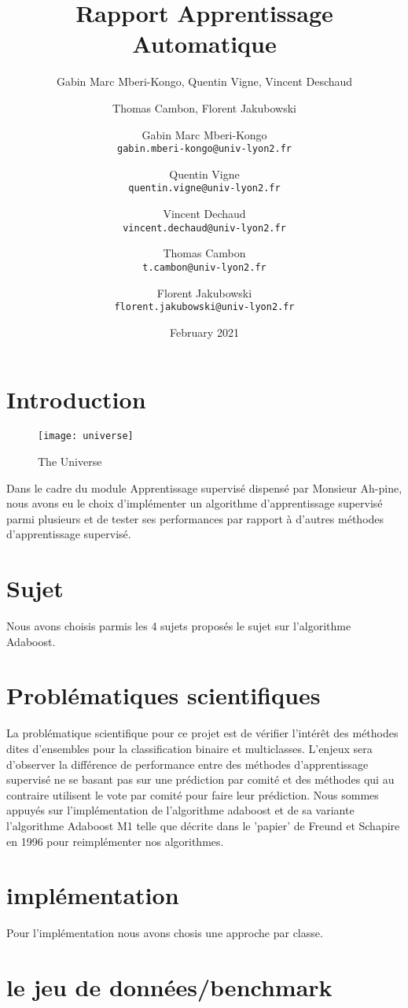 \documentclass{article}
\title{Rapport Apprentissage Automatique}
\author{Gabin Marc Mberi-Kongo, Quentin Vigne, Vincent Deschaud}
\author{Thomas Cambon, Florent Jakubowski }
\author{
  Gabin Marc Mberi-Kongo\\
  \texttt{gabin.mberi-kongo@univ-lyon2.fr}
  \and
  Quentin Vigne\\
  \texttt{quentin.vigne@univ-lyon2.fr}
  \and
  Vincent Dechaud\\
  \texttt{vincent.dechaud@univ-lyon2.fr}
  \and
  Thomas Cambon\\
  \texttt{t.cambon@univ-lyon2.fr}
  \and
  Florent Jakubowski\\
  \texttt{florent.jakubowski@univ-lyon2.fr}
}
\date{February 2021}
\begin{document}
\maketitle

\tableofcontents

\section{Introduction}

\begin{figure}[h!]
\centering
\texttt{[image: universe]}
\caption{The Universe}
\label{fig:universe}
\end{figure}

Dans le cadre du module Apprentissage supervisé dispensé par Monsieur Ah-pine, nous avons eu le choix d'implémenter un algorithme d'apprentissage supervisé parmi plusieurs et de tester ses performances par rapport à d'autres méthodes d'apprentissage supervisé. 

\section{Sujet}
Nous avons choisis parmis les 4 sujets proposés le sujet sur l'algorithme Adaboost.
\section{Problématiques scientifiques}
La problématique scientifique pour ce projet est de vérifier l'intérêt des méthodes dites d'ensembles pour la classification binaire et multiclasses. L'enjeux sera d'observer la différence de performance entre des méthodes d'apprentissage supervisé ne se basant pas sur une prédiction par comité et des méthodes qui au contraire utilisent le vote par comité pour faire leur prédiction.
Nous sommes appuyés sur l'implémentation de l'algorithme adaboost et de sa variante l'algorithme Adaboost M1 telle que décrite dans le 'papier' de Freund et Schapire \citep{FreundSchapire1996} en 1996 pour reimplémenter nos algorithmes.

\section{implémentation}
Pour l'implémentation nous avons chosis une approche par classe.
\section{le jeu de données/benchmark}
\end{document}

